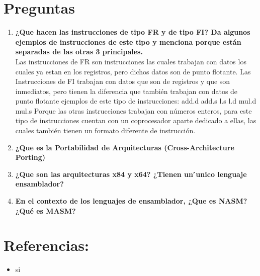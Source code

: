 \documentclass{article}
\begin{document}
	\section*{Preguntas}
  \begin{enumerate}
    \item \textbf{¿Que hacen las instrucciones de tipo FR y de tipo FI? Da algunos ejemplos de instrucciones de este tipo y menciona porque están separadas de las otras 3 principales.\\}
	Las instrucciones de FR son instrucciones las cuales trabajan con datos los cuales ya estan en los registros, pero dichos datos son de punto flotante.
Las Instrucciones de FI trabajan con datos que son de registros y que son inmediatos, pero tienen la diferencia que también trabajan con datos de punto flotante
ejemplos de este tipo de instrucciones:
add.d 
add.s
l.s
l.d
mul.d
mul.s
Porque las otras instrucciones trabajan con números enteros, para este tipo de instrucciones cuentan con un coprocesador aparte dedicado a ellas, las cuales también tienen un formato diferente de instrucción.

    \item \textbf{¿Que es la Portabilidad de Arquitecturas (Cross-Architecture Porting)\\}
    \item \textbf{¿Que son las arquitecturas x84 y x64? ¿Tienen un  ́unico lenguaje ensamblador?\\}
    \item \textbf{En el contexto de los lenguajes de ensamblador, ¿Que es NASM? ¿Qué es MASM?\\}
  \end{enumerate}
  \section*{Referencias:}
		\begin{itemize}
			\item si
		\end{itemize}
	\restoregeometry
\end{document}
